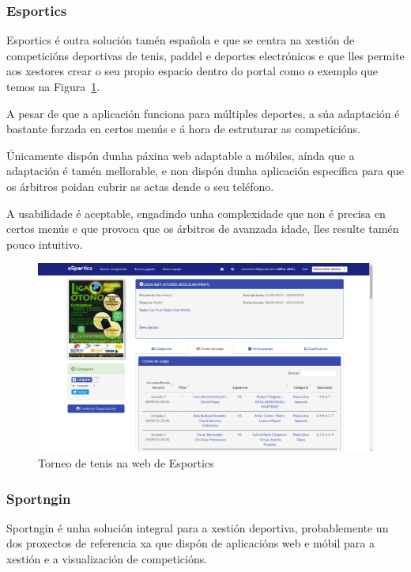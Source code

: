     \subsubsection{Esportics}

    Esportics é outra solución tamén española e que se centra na xestión de 
competicións deportivas de tenis, paddel e deportes electrónicos e que lles 
permite aos xestores crear o seu propio espacio dentro do portal como o exemplo 
que temos na Figura~\ref{fig:img:esportics}.

A pesar de que a aplicación funciona para múltiples deportes, a súa adaptación 
é bastante forzada en certos menús e á hora de estruturar as competicións.

    Únicamente dispón dunha páxina web adaptable a móbiles, aínda que a 
adaptación é  tamén mellorable, e non dispón dunha aplicación específica para 
que os árbitros poidan cubrir as actas dende o seu teléfono.

    A usabilidade é aceptable, engadindo unha complexidade 
que non é precisa en certos menús e que provoca que os árbitros de avanzada 
idade, lles resulte tamén pouco intuitivo.

    \begin{figure}[h!]
      \begin{center}
	\includegraphics[width=\textwidth]{./img/esportics-app.png}
	\caption{Torneo de tenis na web de Esportics}
	\label{fig:img:esportics}
      \end{center}
    \end{figure}

    \subsubsection{Sportngin}

    Sportngin é unha solución integral para a xestión deportiva, probablemente 
un dos proxectos de referencia xa que dispón de aplicacións web e móbil para a 
xestión e a visualización de competicións.


